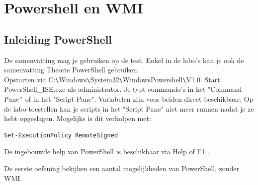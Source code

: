 \documentclass[11pt,a4paper]{report}
\begin{document}
\chapter{Powershell en WMI}
\section{Inleiding PowerShell}

De samenvatting mag je gebruiken op de test. Enkel in de labo's kan je ook de samenvatting Theorie PowerShell gebruiken.
\\Opstarten via C:\verb+\+Windows\verb+\+System32\verb+\+WindowsPowershell\verb+\+V1.0. Start PowerShell\_ISE.exe als administrator. Je typt commando's in het "Command Pane$"$ of in het "Script Pane". Variabelen zijn voor beiden direct beschikbaar. Op de labo-toestellen kan je scripts in het "Script Pane" niet meer runnen nadat je ze hebt opgeslagen. Mogelijks is dit verholpen met:
\begin{lstlisting}
Set-ExecutionPolicy RemoteSigned
\end{lstlisting}
De ingebouwde help van PowerShell is beschikbaar via Help of F1 .

De eerste oefening bekijken een aantal mogelijkheden van PowerShell, zonder WMI.
\end{document}
